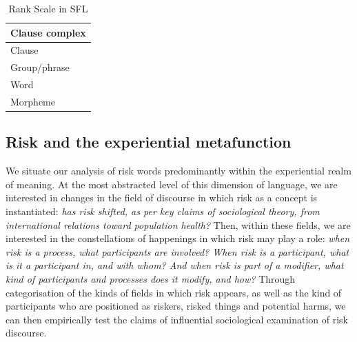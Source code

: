 	\begin{table}
	  \centering
		  \begin{tabular}{|l|}
		  \hline
		  Clause complex \\ \hline
		  Clause		 \\ \hline
		  Group/phrase   \\ \hline
		  Word		   \\ \hline
		  Morpheme	   \\ \hline
		  \end{tabular}
		  \caption{Rank Scale in SFL}
		  \label{tab:rank}
	  \end{table}

		\subsection{Risk and the experiential metafunction}


			We situate our analysis of risk words predominantly within the experiential realm of meaning. At the most abstracted level of this dimension of language, we are interested in changes in the field of discourse in which risk as a concept is instantiated: \emph{has risk shifted, as per key claims of sociological theory, from international relations toward population health?} Then, within these fields, we are interested in the constellations of happenings in which risk may play a role: \emph{when risk is a process, what participants are involved? When risk is a participant, what is it a participant in, and with whom? And when risk is part of a modifier, what kind of participants and processes does it modify, and how?} Through categorisation of the kinds of fields in which risk appears, as well as the kind of participants who are positioned as riskers, risked things and potential harms, we can then empirically test the claims of influential sociological examination of risk discourse. %

			~\ 
			



